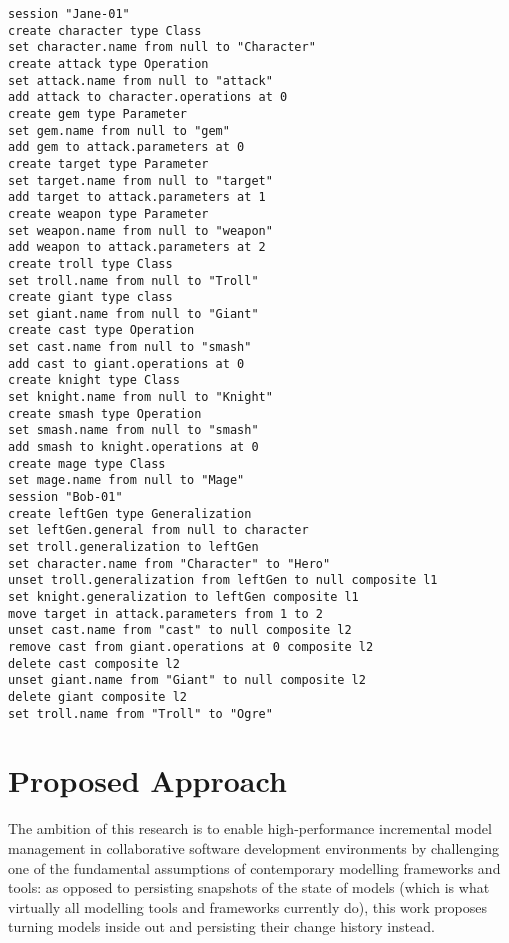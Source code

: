 \begin{lstlisting}[style=eol,escapechar=|,caption={The complete version of Bob's change events in Listing \ref{lst:cbp_left}.},label=lst:cbp_left_full]
session "Jane-01"
create character type Class
set character.name from null to "Character" 
create attack type Operation
set attack.name from null to "attack" 
add attack to character.operations at 0
create gem type Parameter
set gem.name from null to "gem" 
add gem to attack.parameters at 0
create target type Parameter
set target.name from null to "target" 
add target to attack.parameters at 1
create weapon type Parameter
set weapon.name from null to "weapon" 
add weapon to attack.parameters at 2
create troll type Class
set troll.name from null to "Troll" 
create giant type class
set giant.name from null to "Giant"
create cast type Operation
set cast.name from null to "smash"
add cast to giant.operations at 0
create knight type Class
set knight.name from null to "Knight"
create smash type Operation
set smash.name from null to "smash"
add smash to knight.operations at 0
create mage type Class
set mage.name from null to "Mage" 
session "Bob-01"
create leftGen type Generalization
set leftGen.general from null to character
set troll.generalization to leftGen
set character.name from "Character" to "Hero"
unset troll.generalization from leftGen to null composite l1
set knight.generalization to leftGen composite l1
move target in attack.parameters from 1 to 2
unset cast.name from "cast" to null composite l2
remove cast from giant.operations at 0 composite l2
delete cast composite l2
unset giant.name from "Giant" to null composite l2
delete giant composite l2
set troll.name from "Troll" to "Ogre"
\end{lstlisting}


\section{Proposed Approach}
\label{sec:proposed_approach}

The ambition of this research is to enable high-performance incremental model management in collaborative software development environments by challenging one of the fundamental assumptions of contemporary modelling frameworks and tools: as opposed to persisting snapshots of the state of models (which is what virtually all modelling tools and frameworks currently do), this work proposes turning models inside out and persisting their change history instead.

